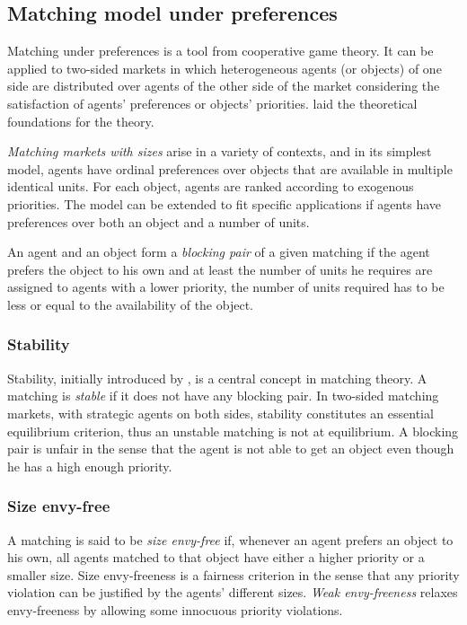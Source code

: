 \subsection{Matching model under preferences}\label{matching-model-under-preferences}%

Matching under preferences is a tool from cooperative game theory.
It can be applied to two-sided markets in which heterogeneous agents (or objects) of one side are distributed over agents of the other side of the market considering the satisfaction of agents’ preferences or objects’ priorities. \citet{gale_1962} laid the theoretical foundations for the theory.

\textit{Matching markets with sizes} arise in a variety of contexts, and in its simplest model, agents have ordinal preferences over objects that are available in multiple identical units. For each object, agents are ranked according to exogenous priorities. The model can be extended to fit specific applications if agents have preferences over both an object and a number of units.

An agent and an object form a \textit{blocking pair} of a given matching if the agent prefers the object to his own and at least the number of units he requires are assigned to agents with a lower priority, the number of units required has to be less or equal to the availability of the object.


\subsubsection{Stability}%

Stability, initially introduced by \citet{gale_1962}, is a central concept in matching theory. A matching is \textit{stable} if it does not have any blocking pair. In two-sided matching markets, with strategic agents on both sides, stability constitutes an essential equilibrium criterion, thus an unstable matching is not at equilibrium. A blocking pair is unfair in the sense that the agent is not able to get an object even though he has a high enough priority.


\subsubsection{Size envy-free}%

A matching is said to be \textit{size envy-free} if, whenever an agent prefers an object to his own, all agents matched to that object have either a higher priority or a smaller size. Size envy-freeness is a fairness criterion in the sense that any priority violation can be justified by the agents' different sizes. \textit{Weak envy-freeness} relaxes envy-freeness by allowing some innocuous priority violations.


